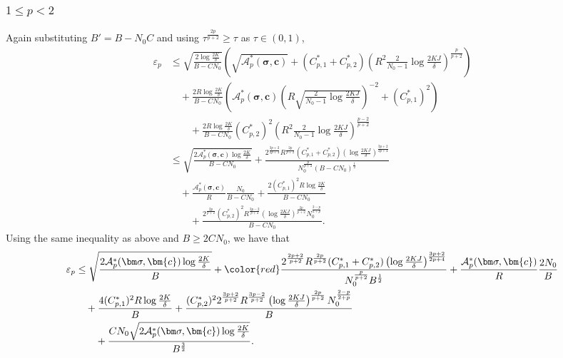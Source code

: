 \documentclass{article}
\def\vc{{\bm{c}}}
\def\gA{{\mathcal{A}}}
\theoremstyle{plain}
\theoremstyle{definition}
\theoremstyle{plain}
\begin{document}
\subsubsection{\texorpdfstring{$1 \leq p < 2$}{p is greater than or equal to 1 and less than 2}}
Again substituting $B' = B - N_0 C$ and using $\tau^{\frac{2p}{p+2}} \geq \tau$ as $\tau \in (0, 1)$,
\begin{align}
    \varepsilon_p &\leq \sqrt{\frac{2 \log\frac{2K}{\delta}}{B - C N_0}} \left( \sqrt{\gA_p^*(\bm\sigma, \vc)} + (C_{p,1}^* + C_{p,2}^*) \left( R^2 \frac{2}{N_0 - 1} \log\frac{2 K J}{\delta} \right)^{\frac{p}{p+2}} \right) \\
    &\quad + \frac{2 R \log\frac{2K}{\delta}}{B - C N_0} \left( \gA_p^*(\bm\sigma, \vc) \left( R \sqrt{\frac{2}{N_0 - 1} \log\frac{2 K J}{\delta}} \right)^{-2} + (C_{p,1}^*)^2 \right) \\
    &\quad\quad + \frac{2 R \log\frac{2K}{\delta}}{B - C N_0} (C_{p,2}^*)^2 \left( R^2 \frac{2}{N_0 - 1} \log\frac{2 K J}{\delta} \right)^{\frac{p - 2}{p + 2}} \\
    &\leq \sqrt{\frac{2 \gA_p^*(\bm\sigma, \vc) \log\frac{2K}{\delta}}{B - C N_0}} + \frac{2^{\frac{3p+2}{2p+4}} R^{\frac{2p}{p+2}} (C_{p,1}^* + C_{p,2}^*) \left( \log\frac{2KJ}{\delta} \right)^{\frac{3p+2}{2p+4}}}{N_0^{\frac{p}{p+2}} (B - C N_0)^{\frac{1}{2}}} \\
    &\quad + \frac{\gA_p^*(\bm\sigma, \vc)}{R} \frac{N_0}{B - C N_0} + \frac{2 (C_{p,1}^*)^2 R \log\frac{2K}{\delta}}{B - C N_0} \\
    &\quad\quad + \frac{2^{\frac{2p}{p+2}} (C_{p,2}^*)^2 R^{\frac{3p - 2}{p + 2}} \left( \log\frac{2 K J}{\delta} \right)^{\frac{2p}{p+2}} N_0^{\frac{2 - p}{2 + p}}}{B - C N_0}.
\end{align}
Using the same inequality as above and $B \geq 2 C N_0$, we have that
\begin{align}
    \varepsilon_p &\leq \sqrt{\frac{2 \gA_p^*(\bm\sigma, \vc) \log\frac{2K}{\delta}}{B}} + {\color{red}\frac{2^{\frac{2p+2}{p+2}} R^{\frac{2p}{p+2}} (C_{p,1}^* + C_{p,2}^*) \left( \log\frac{2KJ}{\delta} \right)^{\frac{3p+2}{2p+4}}}{N_0^{\frac{p}{p+2}} B^{\frac{1}{2}}} + \frac{\gA_p^*(\bm\sigma, \vc)}{R} \frac{2 N_0}{B}} \\
    &\quad + \frac{4 (C_{p,1}^*)^2 R \log\frac{2K}{\delta}}{B} + \frac{(C_{p,2}^*)^2 2^{\frac{3p+2}{p+2}} R^{\frac{3p - 2}{p + 2}} \left( \log\frac{2 K J}{\delta} \right)^{\frac{2p}{p+2}} N_0^{\frac{2 - p}{2 + p}}}{B} \\
    &\quad\quad + \frac{C N_0 \sqrt{2 \gA_p^*(\bm\sigma, \vc) \log\frac{2K}{\delta}}}{B^{\frac{3}{2}}}.
\end{align}
\end{document}
